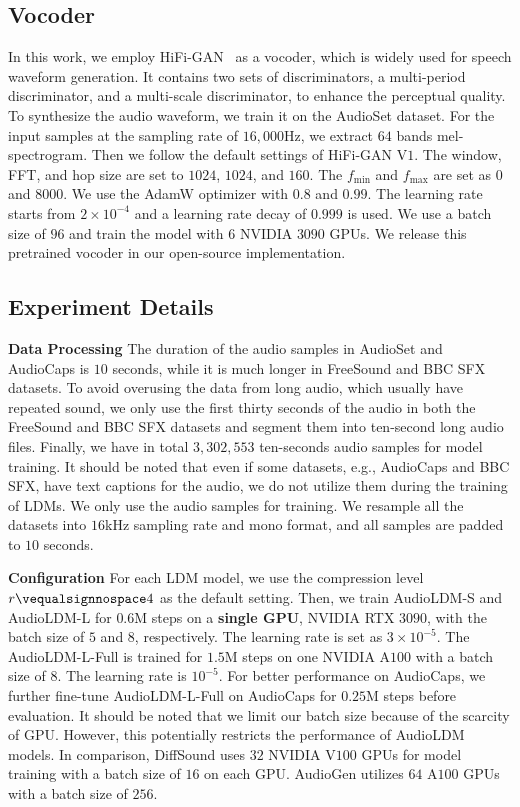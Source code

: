 \subsection{Vocoder}
\label{app:HiFi-GAN}

In this work, we employ HiFi-GAN~\cite{kong2020hifi} as a vocoder, which is widely used for speech waveform generation. It contains two sets of discriminators, a multi-period discriminator, and a multi-scale discriminator, to enhance the perceptual quality. To synthesize the audio waveform, we train it on the AudioSet dataset. For the input samples at the sampling rate of $16,000$Hz, we extract $64$ bands mel-spectrogram. Then we follow the default settings of HiFi-GAN V$1$. The window, FFT, and hop size are set to $1024$, $1024$, and $160$. The $f_{\text{min}}$ and $f_{\text{max}}$ are set as $0$ and $8000$. We use the AdamW optimizer with $0.8$ and $0.99$. The learning rate starts from $2\times 10^{-4}$ and a learning rate decay of $0.999$ is used. We use a batch size of $96$ and train the model with $6$ NVIDIA $3090$ GPUs. We release this pretrained vocoder in our open-source implementation.

\subsection{Experiment Details}
\label{app:TrainingDetails}

\textbf{Data Processing} The duration of the audio samples in AudioSet and AudioCaps is $10$ seconds, while it is much longer in FreeSound and BBC SFX datasets. To avoid overusing the data from long audio, which usually have repeated sound, we only use the first thirty seconds of the audio in both the FreeSound and BBC SFX datasets and segment them into ten-second long audio files. Finally, we have in total $3,302,553$ ten-seconds audio samples for model training. It should be noted that even if some datasets, e.g., AudioCaps and BBC SFX, have text captions for the audio, we do not utilize them during the training of LDMs. We only use the audio samples for training. We resample all the datasets into $16$kHz sampling rate and mono format, and all samples are padded to $10$ seconds. 

\textbf{Configuration} For each LDM model, we use the compression level $r\vequalsignnospace4$ as the default setting. Then, we train AudioLDM-S and AudioLDM-L for $0.6$M steps on a \textbf{single GPU}, NVIDIA RTX $3090$, with the batch size of $5$ and $8$, respectively. The learning rate is set as $3\times 10^{-5}$. The AudioLDM-L-Full is trained for $1.5$M steps on one NVIDIA A$100$ with a batch size of $8$. The learning rate is $10^{-5}$. For better performance on AudioCaps, we further fine-tune AudioLDM-L-Full on AudioCaps for $0.25$M steps before evaluation. It should be noted that we limit our batch size because of the scarcity of GPU. However, this potentially restricts the performance of AudioLDM models. In comparison, DiffSound uses $32$ NVIDIA V$100$ GPUs for model training with a batch size of $16$ on each GPU. AudioGen utilizes $64$ A$100$ GPUs with a batch size of $256$. 

